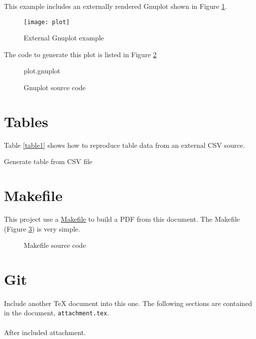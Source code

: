 \documentclass[10pt,a4paper]{article}
\begin{document}
This example includes an externally rendered Gnuplot shown in Figure
\ref{fig:external}.
\begin{figure}
  \centering
	\texttt{[image: plot]}
  \caption{External Gnuplot example}
	\label{fig:external}
\end{figure}
The code to generate this plot is listed in Figure \ref{lst:external}
\begin{figure}
  \begin{lstinputlisting}[language=Gnuplot]{plot.gnuplot}
  \end{lstinputlisting}
  \caption{Gnuplot source code}
	\label{lst:external}
\end{figure}

\sectionbreak{}

\section*{Tables}

Table \ref{table1} shows how to reproduce table data from an external CSV
source.
\begin{table}
  \begin{center}
    \caption{Generate table from CSV file}
		\label{table1}
  \end{center}
\end{table}

\lipsum[3]

\sectionbreak{}

\section*{Makefile}

This project use a \href{https://www.gnu.org/software/make/}{Makefile} to build
a PDF from this document. The Makefile (Figure \ref{lst:makefile}) is very simple.
\begin{figure}
  
  \caption{Makefile source code}
	\label{lst:makefile}
\end{figure}

\sectionbreak{}

\section*{Git}

\paragraph{}
Include another TeX document into this one. The following sections are
contained in the document, \texttt{attachment.tex}.



\paragraph{}
After included attachment.
\end{document}
